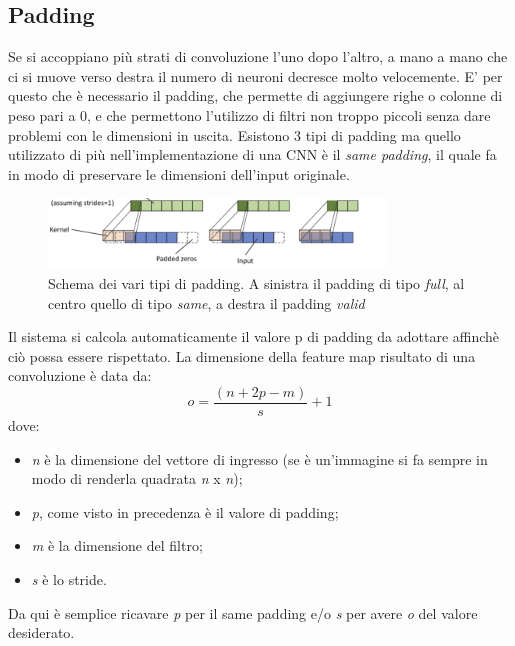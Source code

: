 \subsection{Padding}
Se si accoppiano più strati di convoluzione l’uno dopo l’altro, a mano a mano 
che ci si muove verso destra il numero di neuroni decresce molto velocemente. 
E’ per questo che è necessario il padding, che permette di aggiungere righe o
 colonne di peso pari a 0, e che permettono l’utilizzo di filtri non troppo piccoli 
 senza dare problemi con le dimensioni in uscita. Esistono 3 tipi di padding ma quello utilizzato
  di più nell’implementazione di una CNN è il \emph{same padding}, il quale fa in modo di
   preservare le dimensioni dell’input originale.\\
   \begin{figure}[H]
     \centering
     \includegraphics[width=0.8\textwidth]{Figures/padding.PNG}
     \caption{\small{
          Schema dei vari tipi di padding. A sinistra il padding di tipo \emph{full}, al centro quello di tipo \emph{same}, a destra il padding \emph{valid}~\cite{tesi}
     }
     } %
     \label{fi:dcalc}
   \end{figure}
    Il sistema si calcola automaticamente il valore p di padding da adottare affinchè ciò 
    possa essere rispettato. 
La dimensione della feature map risultato di una convoluzione è data da:
$$ o = \frac{(n + 2p - m)}{s} + 1 $$ 
dove:
\begin{itemize}
     \item \emph{n} è la dimensione del vettore di ingresso (se è un’immagine si fa 
sempre in modo di renderla quadrata \emph{n} x \emph{n});
\item \emph{p}, come visto in precedenza è il valore di padding;
\item \emph{m} è la dimensione del filtro;
\item \emph{s} è lo stride.
\end{itemize}
Da qui è semplice ricavare \emph{p} per il same padding e/o \emph{s} per avere \emph{o} del valore desiderato.


